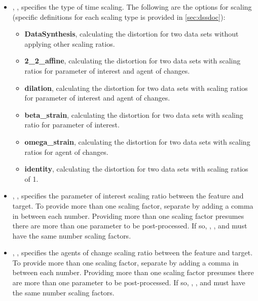\begin{itemize}
    \item {}, , specifies the type of time scaling. The following are the options for scaling (specific definitions for each scaling type is provided in \ref{sec:dssdoc}):
      \begin{itemize}
        \item \textbf{DataSynthesis}, calculating the distortion for two data sets without applying other scaling ratios.
        \item \textbf{2\_2\_affine}, calculating the distortion for two data sets with scaling ratios for parameter of interest and agent of changes.
        \item \textbf{dilation}, calculating the distortion for two data sets with scaling ratios for parameter of interest and agent of changes.
        \item \textbf{beta\_strain}, calculating the distortion for two data sets with scaling ratio for parameter of interest.
        \item \textbf{omega\_strain}, calculating the distortion for two data sets with scaling ratios for agent of changes.
        \item \textbf{identity}, calculating the distortion for two data sets with scaling ratios of 1.
      \end{itemize}
    \item {}, , specifies the parameter of interest scaling ratio between the feature and target.
    To provide more than one scaling factor, separate by adding a comma in between each number. Providing more than one scaling factor presumes there are more than one parameter to be post-processed.
    If so, , , and  must have the same number scaling factors.
    \item {}, , specifies the agents of change scaling ratio between the feature and target.
    To provide more than one scaling factor, separate by adding a comma in between each number. Providing more than one scaling factor presumes there are more than one parameter to be post-processed.
    If so, , , and  must have the same number scaling factors.
\end{itemize}

